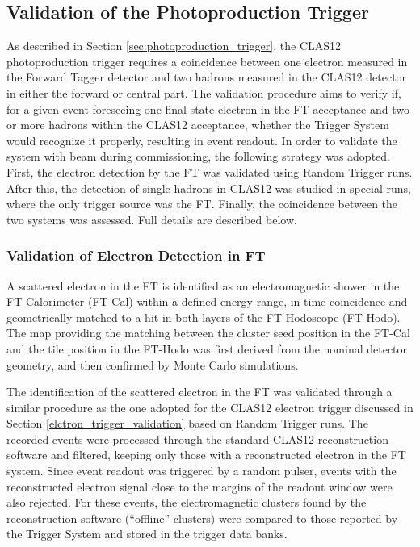 \subsection{Validation of the Photoproduction Trigger}

As described in Section \ref{sec:photoproduction_trigger}, the CLAS12 photoproduction trigger requires a coincidence between one electron measured in the Forward Tagger detector and two hadrons measured in the CLAS12 detector in either the forward or central part. The validation procedure aims to verify if, for a given event foreseeing one final-state electron in the FT acceptance and two or more hadrons within the CLAS12 acceptance, whether the Trigger System would recognize it properly, resulting in event readout. In order to validate the system with beam during commissioning, the following strategy was adopted. First, the electron detection by the FT was validated using Random Trigger runs. After this, the detection of single hadrons in CLAS12 was studied in special runs, where the only trigger source was the FT. Finally, the coincidence between the two systems was assessed. Full details are described below.

\subsubsection{Validation of Electron Detection in FT}

A scattered electron in the FT is identified as an electromagnetic shower in the FT Calorimeter (FT-Cal) within a defined energy range, in time coincidence and geometrically matched to a hit in both layers of the FT Hodoscope (FT-Hodo). The map providing the matching between the cluster seed position in the FT-Cal and the tile position in the FT-Hodo was first derived from the nominal detector geometry, and then confirmed by Monte Carlo simulations.

The identification of the scattered electron in the FT was validated through a similar procedure as the one adopted for the CLAS12 electron trigger discussed in Section \ref{elctron_trigger_validation} based on Random Trigger runs. The recorded events were processed through the standard CLAS12 reconstruction software and filtered, keeping only those with a reconstructed electron in the FT system. Since event readout was triggered by a random pulser, events with the reconstructed electron signal close to the margins of the readout window were also rejected. For these events, the electromagnetic clusters found by the reconstruction software (``offline'' clusters) were compared to those reported by the Trigger System and stored in the trigger data banks.

